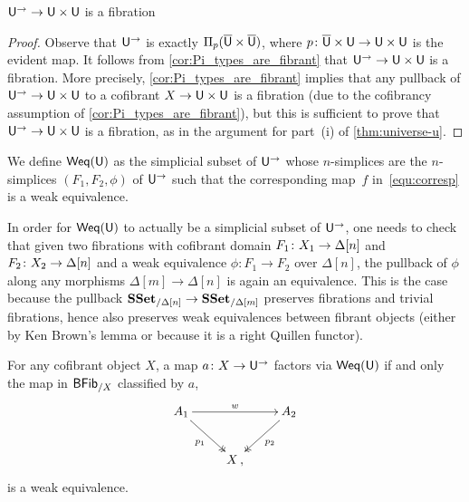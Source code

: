 \documentclass[reqno,10pt,a4paper,oneside,draft]{amsart}
\begin{document}
\begin{lemma} $\mathsf{U}^{\rightarrow} \rightarrow \mathsf{U} \times \mathsf{U}$ is a fibration
\end{lemma}

\begin{proof} Observe that $\mathsf{U}^{\rightarrow}$ is exactly $\Pi_p(\overline{\mathsf{U}} \times \overline{\mathsf{U}})$, 
where $p \colon \overline{\mathsf{U}} \times \mathsf{U} \rightarrow \mathsf{U} \times \mathsf{U}$ is the evident map. 
It follows from \cref{cor:Pi_types_are_fibrant} that $\mathsf{U}^{\rightarrow} \rightarrow \mathsf{U} \times \mathsf{U}$ is a fibration.
More precisely, \cref{cor:Pi_types_are_fibrant} implies that any pullback of  $\mathsf{U}^{\rightarrow} \rightarrow \mathsf{U} \times \mathsf{U}$ to a cofibrant
$X \rightarrow \mathsf{U} \times \mathsf{U}$ is a fibration (due to the cofibrancy assumption of  \cref{cor:Pi_types_are_fibrant}),
but this is sufficient to prove that $\mathsf{U}^{\rightarrow} \rightarrow \mathsf{U} \times \mathsf{U}$ is a fibration,
as in the argument for part~(i) of  \cref{thm:universe-u}.
\end{proof}


We define $\mathsf{Weq}(\mathsf{U})$ as the simplicial subset of $\mathsf{U}^\to$ whose $n$-simplices are the $n$-simplices $(F_1, F_2, \phi)$ of $\mathsf{U}^\to$ such that the corresponding map~$f$ in~\eqref{equ:corresp} is a weak equivalence.


In order for $\mathsf{Weq}(\mathsf{U})$ to actually be a simplicial subset of $\mathsf{U}^{\to}$, one needs to check that given two fibrations with cofibrant domain $F_1 \colon X_1 \rightarrow \Delta[n]$ and $F_2 \colon X_2 \rightarrow \Delta[n]$ and a weak equivalence $\phi:F_1 \rightarrow F_2$ over $\Delta[n]$, the pullback of $\phi$ along any morphisms $\Delta[m] \rightarrow \Delta[n]$ is again an equivalence. This is the case because the pullback  $\mathbf{SSet}_{/\Delta[n]} \rightarrow \mathbf{SSet}_{/\Delta[m]}$ preserves fibrations and trivial fibrations, hence also preserves weak equivalences between fibrant objects (either by Ken Brown's lemma or because it is a right Quillen functor).



\begin{lemma}
\label{prop:Weq_classify_Weq}
For any cofibrant object $X$, a map $a \colon X \rightarrow \mathsf{U}^{\rightarrow}$ factors via 
 $\mathsf{Weq}(\mathsf{U})$ if and only the map in $\mathsf{BFib}_{/X}$ classified by $a$,
\[
\xymatrix{
A_1 \ar[rr]^w  \ar@{->>}[dr]_{p_1} & & A_2 \ar@{->>}[dl]^{p_2} \\
 & X \, , & }
 \]
is a weak equivalence.
\end{lemma}
\end{document}
